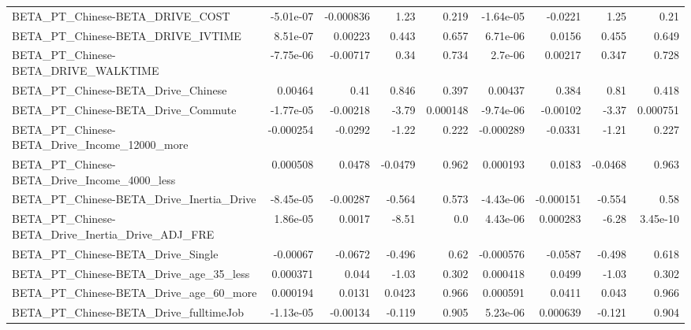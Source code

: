 \begin{tabular}{lrrrrrrrr}
BETA\_PT\_Chinese-BETA\_DRIVE\_COST                    &   -5.01e-07 &    -0.000836 &     1.23 &    0.219 &  -1.64e-05 &     -0.0221 &         1.25 &          0.21 \\
BETA\_PT\_Chinese-BETA\_DRIVE\_IVTIME                  &    8.51e-07 &      0.00223 &    0.443 &    0.657 &   6.71e-06 &      0.0156 &        0.455 &         0.649 \\
BETA\_PT\_Chinese-BETA\_DRIVE\_WALKTIME                &   -7.75e-06 &     -0.00717 &     0.34 &    0.734 &    2.7e-06 &     0.00217 &        0.347 &         0.728 \\
BETA\_PT\_Chinese-BETA\_Drive\_Chinese                 &     0.00464 &         0.41 &    0.846 &    0.397 &    0.00437 &       0.384 &         0.81 &         0.418 \\
BETA\_PT\_Chinese-BETA\_Drive\_Commute                 &   -1.77e-05 &     -0.00218 &    -3.79 & 0.000148 &  -9.74e-06 &    -0.00102 &        -3.37 &      0.000751 \\
BETA\_PT\_Chinese-BETA\_Drive\_Income\_12000\_more       &   -0.000254 &      -0.0292 &    -1.22 &    0.222 &  -0.000289 &     -0.0331 &        -1.21 &         0.227 \\
BETA\_PT\_Chinese-BETA\_Drive\_Income\_4000\_less        &    0.000508 &       0.0478 &  -0.0479 &    0.962 &   0.000193 &      0.0183 &      -0.0468 &         0.963 \\
BETA\_PT\_Chinese-BETA\_Drive\_Inertia\_Drive           &   -8.45e-05 &     -0.00287 &   -0.564 &    0.573 &  -4.43e-06 &   -0.000151 &       -0.554 &          0.58 \\
BETA\_PT\_Chinese-BETA\_Drive\_Inertia\_Drive\_ADJ\_FRE   &    1.86e-05 &       0.0017 &    -8.51 &      0.0 &   4.43e-06 &    0.000283 &        -6.28 &      3.45e-10 \\
BETA\_PT\_Chinese-BETA\_Drive\_Single                  &    -0.00067 &      -0.0672 &   -0.496 &     0.62 &  -0.000576 &     -0.0587 &       -0.498 &         0.618 \\
BETA\_PT\_Chinese-BETA\_Drive\_age\_35\_less             &    0.000371 &        0.044 &    -1.03 &    0.302 &   0.000418 &      0.0499 &        -1.03 &         0.302 \\
BETA\_PT\_Chinese-BETA\_Drive\_age\_60\_more             &    0.000194 &       0.0131 &   0.0423 &    0.966 &   0.000591 &      0.0411 &        0.043 &         0.966 \\
BETA\_PT\_Chinese-BETA\_Drive\_fulltimeJob             &   -1.13e-05 &     -0.00134 &   -0.119 &    0.905 &   5.23e-06 &    0.000639 &       -0.121 &         0.904 \\

\end{tabular}
